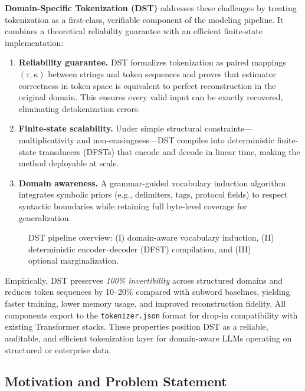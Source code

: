 \textbf{Domain-Specific Tokenization (DST)} addresses these challenges by treating tokenization as a first-class, verifiable component of the modeling pipeline.
It combines a theoretical reliability guarantee with an efficient finite-state implementation:

\begin{enumerate}
    \item \textbf{Reliability guarantee.}
    DST formalizes tokenization as paired mappings $(\tau,\kappa)$ between strings and token sequences and proves that estimator correctness in token space is equivalent to perfect reconstruction in the original domain.
    This ensures every valid input can be exactly recovered, eliminating detokenization errors.
    \item \textbf{Finite-state scalability.}
    Under simple structural constraints---multiplicativity and non-erasingness---DST compiles into deterministic finite-state transducers (DFSTs) that encode and decode in linear time, making the method deployable at scale.
    \item \textbf{Domain awareness.}
    A grammar-guided vocabulary induction algorithm integrates symbolic priors (e.g., delimiters, tags, protocol fields) to respect syntactic boundaries while retaining full byte-level coverage for generalization.
\end{enumerate}

\begin{figure}[t]
  \centering
  \setlength{\fboxsep}{0pt}\fbox{\rule{0pt}{120pt}\rule{240pt}{0pt}}
  \caption{DST pipeline overview: (I) domain-aware vocabulary induction, (II) deterministic encoder–decoder (DFST) compilation, and (III) optional marginalization.}
  \label{fig:dst_pipeline}
\end{figure}

Empirically, DST preserves \emph{100\% invertibility} across structured domains and reduces token sequences by 10--20\% compared with subword baselines, yielding faster training, lower memory usage, and improved reconstruction fidelity.
All components export to the \texttt{tokenizer.json} format for drop-in compatibility with existing Transformer stacks.
These properties position DST as a reliable, auditable, and efficient tokenization layer for domain-aware LLMs operating on structured or enterprise data.

\subsection{Motivation and Problem Statement}

